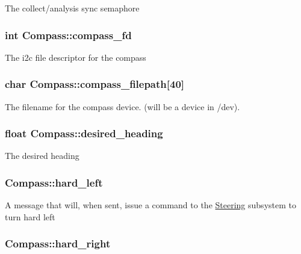 The collect/analysis sync semaphore \hypertarget{classCompass_a44b0e4223918e3b139e54d54a0e3daad}{
\subsubsection[{compass\-\_\-fd}]{\setlength{\rightskip}{0pt plus 5cm}int Compass\-::compass\-\_\-fd\hspace{0.3cm}{\ttfamily [protected]}}}\label{classCompass_a44b0e4223918e3b139e54d54a0e3daad}
The i2c file descriptor for the compass \hypertarget{classCompass_a6ff33d93efe79539c75dbee45efdc97c}{
\subsubsection[{compass\-\_\-filepath}]{\setlength{\rightskip}{0pt plus 5cm}char Compass\-::compass\-\_\-filepath\mbox{[}40\mbox{]}\hspace{0.3cm}{\ttfamily [protected]}}}\label{classCompass_a6ff33d93efe79539c75dbee45efdc97c}
The filename for the compass device. (will be a device in /dev). \hypertarget{classCompass_ac888a4dacdc477e53c99fe8e110966ae}{
\subsubsection[{desired\-\_\-heading}]{\setlength{\rightskip}{0pt plus 5cm}float Compass\-::desired\-\_\-heading\hspace{0.3cm}{\ttfamily [protected]}}}\label{classCompass_ac888a4dacdc477e53c99fe8e110966ae}
The desired heading \hypertarget{classCompass_a5cbc2cebdd91222c5ccf5bd28aa35ced}{
\subsubsection[{hard\-\_\-left}]{ Compass\-::hard\-\_\-left}}\label{classCompass_a5cbc2cebdd91222c5ccf5bd28aa35ced}
A message that will, when sent, issue a command to the \hyperlink{classSteering}{Steering} subsystem to turn hard left \hypertarget{classCompass_a15cd7eda15b824c8d5821a46667b861c}{
\subsubsection[{hard\-\_\-right}]{ Compass\-::hard\-\_\-right}}\label{classCompass_a15cd7eda15b824c8d5821a46667b861c}
